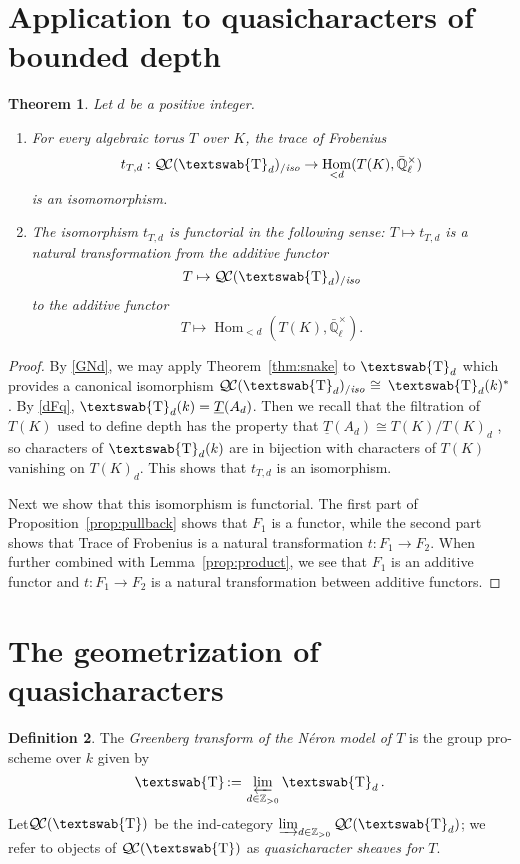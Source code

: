 \documentclass[11pt]{amsart}
\newcommand{\mathswab}[1]{\operatorname{\textswab{#1}}}
\theoremstyle{plain}
\newtheorem{theorem}{Theorem}[section]
\theoremstyle{definition}
\newtheorem{definition}[theorem]{Definition}
\theoremstyle{remark}
\newcommand{\ZZ}{{\mathbb{Z}}}
\newcommand{\EE}{\mathbb{\bar Q}_\ell}
\newcommand{\Fq}{k}
\newcommand{\EEx}{\EE^\times}
\DeclareMathOperator{\Hom}{Hom}
\newcommand{\cdef}[1]{ {#1}\index{#1} }
\newcommand{\ceq}{{\, :=\, }}
\newcommand{\iso}{{\ \cong\ }}
\newcommand{\GN}[1]{\mathswab{#1}}
\newcommand{\TT}{\underline{T}}
\newcommand{\QC}{{\mathcal{Q\hskip-0.8pt C}}}
\newcommand{\QCiso}[1]{\QC(#1)_{/\textit{iso}}}
\newcommand{\trFrob}[1]{t_{#1}}
\begin{document}
\section{Application to quasicharacters of bounded depth} \label{sec:bdchar}

\begin{theorem}\label{thm:application}
Let $d$ be a positive integer.
\begin{enumerate}
\item 
For every algebraic torus $T$ over $K$, the trace of Frobenius 
  \[
\trFrob{T,d}:  \QCiso{\GN{T}_d} \to \Hom_{< d}(T(K),\EEx)
  \]
is an isomomorphism. 
\item The isomorphism $\trFrob{T,d}$ is functorial in the following sense: $T \mapsto \trFrob{T,d}$ is a natural transformation
from the additive functor
\[T \mapsto \QCiso{\GN{T}_d}\]
to the additive functor
\[
T \mapsto \Hom_{<d}(T(K),\EEx).
\]
\end{enumerate}
\end{theorem}

\begin{proof}
  By \ref{GNd}, we may apply Theorem~\ref{thm:snake} to
  $\GN{T}_d$ which provides a canonical isomorphism
  $\QCiso{\GN{T}_d} \iso \GN{T}_d(\Fq)^*$.
  By \ref{dFq}, $\GN{T}_d(\Fq) = \TT(A_d)$.
  Then we recall that the filtration of $T(K)$ used to
  define depth has the property that $\TT(A_d) \cong T(K) / T(K)_d$
  \cite[Prop 5.2]{Yu}, so characters of $\GN{T}_d(\Fq)$ 
  are in bijection with characters of $T(K)$ vanishing on $T(K)_d$. 
  This shows that $\trFrob{T,d}$ is an isomorphism.
  
  Next we show that this isomorphism is functorial.
The first part of Proposition~\ref{prop:pullback} shows that $F_1$ is a functor, while the second part shows that Trace of Frobenius is a natural transformation $t: F_1 \to F_2$. When further combined with Lemma~\ref{prop:product}, we see that $F_1$ is an additive functor and $t: F_1 \to F_2$ is a natural transformation between additive functors.
\end{proof}


\section{The geometrization of quasicharacters} \label{sec:quasichar} 

\begin{definition}
The \emph{Greenberg transform of the N\'eron model of $T$} is the group pro-scheme over $\Fq$ given by
\begin{equation}\label{projlim}
  \cdef{\GN{T}} \ceq \varprojlim_{d\in \ZZ_{>0}} \GN{T}_{d}.
\end{equation}
Let$\QC(\GN{T})$ be the ind-category $\varinjlim_{d\in \ZZ_{>0}} \QC(\GN{T}_d)$;
we refer to objects of $\QC(\GN{T})$ as \emph{quasicharacter sheaves for $T$}.
\end{definition}
\end{document}
